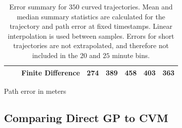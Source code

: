 \begin{table}
\begin{subtable}{\textwidth}
{\begin{tabular}{lllrrrrr}
                        &                & Finite Difference & 274 & 389  & 458  & 403  & 363  \\
                \bottomrule
            \end{tabular}
        }
        \caption{Path error in meters}
        \label{table:stats_curved_path_err}
    \end{subtable}
    \caption{Error summary for $350$ curved trajectories. Mean and median summary statistics are calculated for the trajectory and path error at fixed timestamps. Linear interpolation is used between samples. Errors for short trajectories are not extrapolated, and therefore not included in the $20$ and $25$ minute bins.}
    \label{table:stats_curved_error}
\end{table}


\subsection{Comparing Direct GP to CVM}
